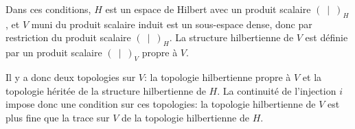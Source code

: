\medskip
Dans ces conditions, \(H\) est un espace de Hilbert avec un produit scalaire \((\ \mid\ )_H\),
et \(V\) muni du produit scalaire induit est un sous-espace dense, donc
 par restriction du produit
scalaire \((\ \mid\ )_H\).
La structure hilbertienne de \(V\) est définie par un produit scalaire \((\ \mid\ )_V\) propre à \(V\).

\medskip
Il y a donc deux topologies sur \(V\): la topologie hilbertienne propre à \(V\) et la
topologie héritée de la structure hilbertienne de \(H\).
La continuité de l'injection \(i\) impose donc une condition sur ces topologies:
la topologie hilbertienne de \(V\) est plus fine que la trace sur \(V\) de la topologie hilbertienne de \(H\).

\medskip
{} 